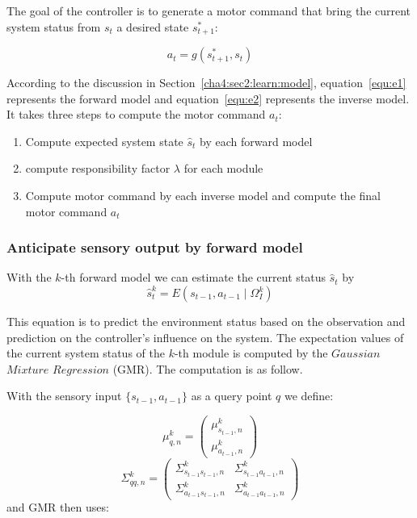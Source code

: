 The goal of the controller is to generate a motor command that bring the current system status from $s_t$ a desired state $s^*_{t+1}$:

\begin{equation}
\label{equ:e2}
a_t = g\left({s^*_{t+1},s_t}\right)
\end{equation}

According to the discussion in Section~\ref{cha4:sec2:learn:model}, equation~\ref{equ:e1} represents the forward model and equation~\ref{equ:e2} represents the inverse model. It takes three steps to compute the motor command $a_t$:
\begin{enumerate}
\item Compute expected system state $\hat{s}_t$ by each forward model
\item compute responsibility factor $\lambda$ for each module
\item Compute motor command by each inverse model and compute the final motor command $a_t$
\end{enumerate}


\subsubsection{Anticipate sensory output by forward model}
\label{cha4:sec2:control:forward}
With the $k$-th forward model we can estimate the current status $\hat{s}_t$ by
\begin{equation}
\label{equ:e3}
\hat{s}^k_{t} = E\left({s_{t-1}, a_{t-1} \mid \Omega^k_I}\right)
\end{equation}

%

This equation is to predict the environment status based on the observation and prediction on the controller's influence on the system. The expectation values of the current system status of the $k$-th module is computed by the $Gaussian$ $Mixture$ $Regression$ (GMR). The computation is as follow.

With the sensory input $\{s_{t-1},a_{t-1}\}$ as a query point $q$ we define:

\begin{equation}
{
 {\mu}_{q,n}^k = \begin{pmatrix} {\mu}_{s_{t-1},n}^k    \\
                                        {\mu}_{a_{t-1},n}^k
                        \end{pmatrix}
}
\end{equation}
\begin{equation}
{
{\Sigma}_{qq,n}^k =  \begin{pmatrix} {\Sigma}_{s_{t-1}s_{t-1},n}^k  & {\Sigma}_{s_{t-1}{a_{t-1},n}}^k  \\
                                            {\Sigma}_{{a_{t-1}}{s_{t-1}},n}^k  & {\Sigma}_{{a_{t-1}}{a_{t-1}},n}^k
                            \end{pmatrix}
}
\end{equation}
and GMR then uses:

